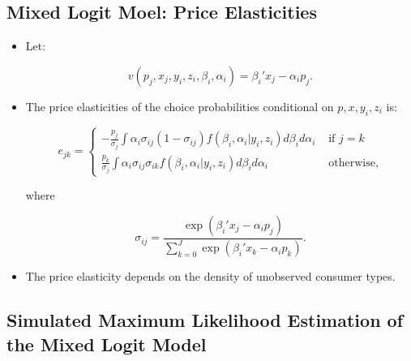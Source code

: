 \documentclass[]{book}
\providecommand{\tightlist}{%
  \setlength{\itemsep}{0pt}\setlength{\parskip}{0pt}}
\begin{document}
\subsection{Mixed Logit Moel: Price
Elasticities}\label{mixed-logit-moel-price-elasticities}

\begin{itemize}
\tightlist
\item
  Let:

  \begin{equation}
  v(p_j, x_j, y_i, z_i, \beta_i, \alpha_i) = \beta_i' x_j - \alpha_i p_j.
  \end{equation}
\item
  The price elasticities of the choice probabilities conditional on
  \(p, x, y_i, z_i\) is:

  \begin{equation}
  e_{jk} = 
  \begin{cases}
  -\frac{p_j}{\sigma_j} \int \alpha_i \sigma_{ij}(1 - \sigma_{ij})f(\beta_i, \alpha_i|y_i, z_i) d\beta_i d\alpha_i &\text{   if   } j = k\\
  \frac{p_k}{\sigma_j} \int \alpha_i \sigma_{ij} \sigma_{ik} f(\beta_i, \alpha_i|y_i, z_i) d\beta_i d\alpha_i &\text{   otherwise},
  \end{cases} 
  \end{equation}

  where

  \begin{equation}
  \sigma_{ij} = \frac{\exp(\beta_i'x_j - \alpha_i p_j)}{\sum_{k = 0}^J \exp(\beta_i'x_k - \alpha_i p_k)}.
  \end{equation}
\item
  The price elasticity depends on the density of unobserved consumer
  types.
\end{itemize}

\subsection{Simulated Maximum Likelihood Estimation of the Mixed Logit
Model}\label{simulated-maximum-likelihood-estimation-of-the-mixed-logit-model}
\end{document}
